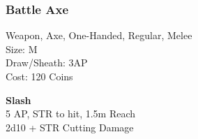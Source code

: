 \subsubsection{Battle Axe}\label{weapon:battleaxe}
Weapon, Axe, One-Handed, Regular, Melee\\
Size: M\\
Draw/Sheath: 3AP\\
Cost: 120 Coins

\textbf{Slash}\\
5 AP, STR to hit, 1.5m Reach\\
2d10 + \texttimes STR Cutting Damage
